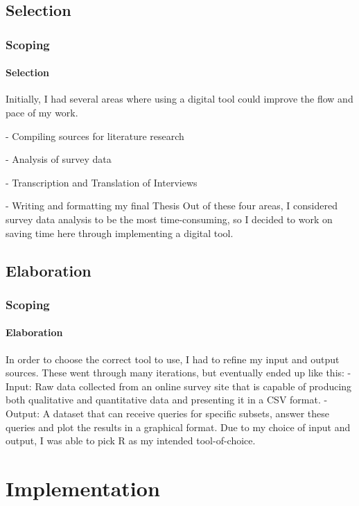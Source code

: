 \documentclass{beamer}
\begin{document}
\subsection{Selection}
\begin{frame}
\frametitle{Scoping}
\framesubtitle{Selection}
Initially, I had several areas where using a digital tool could improve the flow and pace of my work.
\newline
\item - Compiling sources for literature research
\item - Analysis of survey data
\item - Transcription and Translation of Interviews
\item - Writing and formatting my final Thesis
\newline
\newline
Out of these four areas, I considered survey data analysis to be the most time-consuming, so I decided to work on saving time here through implementing a digital tool.
\end{frame}

\subsection{Elaboration}
\begin{frame}
\frametitle{Scoping}
\framesubtitle{Elaboration}
In order to choose the correct tool to use, I had to refine my input and output sources. These went through many iterations, but eventually ended up like this:
\newline
\newline
- Input: Raw data collected from an online survey site that is capable of producing both qualitative and quantitative data and presenting it in a CSV format.
\newline
- Output: A dataset that can receive queries for specific subsets, answer these queries and plot the results in a graphical format.
\newline
\newline
Due to my choice of input and output, I was able to pick R as my intended tool-of-choice.
\end{frame}

\section{Implementation}
\end{document}
